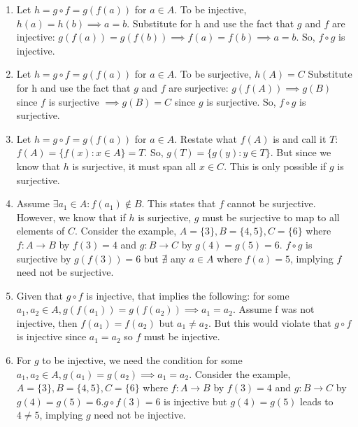 \documentclass[12pt,letterpaper,boxed]{hmcpset}
\begin{document}
\begin{solution}
\begin{enumerate}
	\itemsep0em
	\item Let $h = g \circ f = g(f(a)) $ for $ a \in A.$ To be injective, $h(a) = h(b) \implies a = b.$ Substitute for h and use the fact that $g$ and $f$ are injective: $g(f(a))=g(f(b)) \implies f(a) = f(b) \implies a = b.$ So, $f \circ g$ is injective.
	\item Let $h = g \circ f = g(f(a)) $ for $ a \in A.$ To be surjective, $h(A)=C$ Substitute for h and use the fact that $g$ and $f$ are surjective: $g(f(A)) \implies g(B)$ since $f$ is surjective $ \implies g(B)=C$ since $g$ is surjective. So, $f \circ g$ is surjective.
	\item Let $h = g \circ f = g(f(a)) $ for $ a \in A.$ Restate what $f(A)$ is and call it $T$: $f(A) = \{f(x) : x \in A\} = T.$ So, $ g(T)=\{g(y) : y \in T\}$. But since we know that $h$ is surjective, it must span all $x \in C.$ This is only possible if $g$ is surjective.
	\item Assume $\exists a_1 \in A : f(a_1) \notin B.$ This states that $f$ cannot be surjective. However, we know that if $h$ is surjective, $g$ must be surjective to map to all elements of $C$. Consider the example, $A = \{3\}, B = \{4, 5\}, C = \{6\}$ where $f:A\rightarrow B$ by $f(3) = 4$ and $g:B\rightarrow C$ by $g(4)=g(5)=6.$ $f \circ g$ is surjective by $g(f(3))=6$ but $\nexists$ any $a \in A$ where $f(a)=5$, implying $f$ need not be surjective. 
	\item Given that $g \circ f$ is injective, that implies the following: for some $a_1, a_2 \in A, g(f(a_1)) = g(f(a_2)) \implies a_1 = a_2.$ Assume f was not injective, then $f(a_1) = f(a_2)$ but $a_1 \neq a_2.$ But this would violate that $g \circ f$ is injective since $a_1 = a_2$ so $f$ must be injective.
	\item For $g$ to be injective, we need the condition for some $a_1, a_2 \in A, g(a_1)=g(a_2)\implies a_1 = a_2.$ Consider the example, $A = \{3\}, B = \{4, 5\}, C = \{6\}$ where $f:A\rightarrow B$ by $f(3) = 4$ and $g:B\rightarrow C$ by $g(4)=g(5)=6$.$ g \circ f(3) = 6$ is injective but $g(4)=g(5)$ leads to $4 \neq 5$, implying $g$ need not be injective. 
\end{enumerate}
\end{solution}
\end{document}
